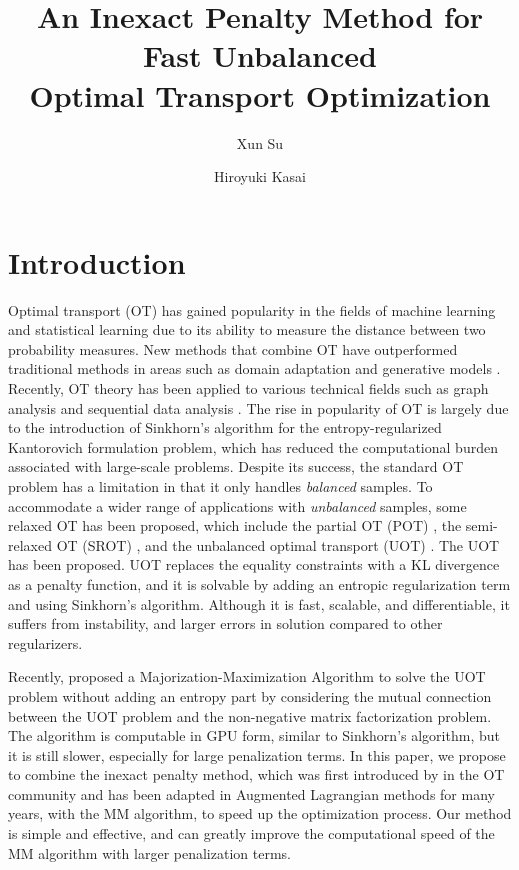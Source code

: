 \documentclass[a4paper,twocolumn]{article}
\title{An Inexact Penalty Method for Fast Unbalanced \protect\\ Optimal Transport Optimization}
\author{%
Xun Su\first
\and
Hiroyuki Kasai\second
}
\begin{document}
\maketitle

\section{Introduction}
\label{sec:int}

Optimal transport (OT) has gained popularity in the fields of machine learning and statistical learning due to its ability to measure the distance between two probability measures. New methods that combine OT have outperformed traditional methods in areas such as domain adaptation \cite{Courty_PAMI_2017} and generative models \cite{arjovsky2017wasserstein}. Recently, OT theory has been applied to various technical fields such as graph analysis \cite{Huang_SigPro_2020,Huang_ICASSP_2021,Fang_AAAI_2023} and sequential data analysis \cite{Horie_EUSIPCO_2022}. The rise in popularity of OT is largely due to the introduction of Sinkhorn's algorithm \cite{Cuturi_NIPS_2013} for the entropy-regularized Kantorovich formulation problem, which has reduced the computational burden associated with large-scale problems. Despite its success, the standard OT problem has a limitation in that it only handles {\it balanced} samples. To accommodate a wider range of applications with {\it unbalanced} samples, some relaxed OT has been proposed, which include the partial OT (POT) \cite{ferradans2013regularized}, the semi-relaxed OT (SROT) \cite{fukunaga_icassp2022,fukunaga_srsinkhorn}, and the unbalanced optimal transport (UOT) \cite{Caffarelli_AM_2010,chizat2017scaling}. The UOT has been proposed. UOT replaces the equality constraints with a KL divergence as a penalty function, and it is solvable by adding an entropic regularization term and using Sinkhorn's algorithm. Although it is fast, scalable, and differentiable, it suffers from instability, and larger errors in solution compared to other regularizers.

Recently, \cite{Chapel_NeurIPS_2021} proposed a Majorization-Maximization Algorithm to solve the UOT problem without adding an entropy part by considering the mutual connection between the UOT problem and the non-negative matrix factorization problem. The algorithm is computable in GPU form, similar to Sinkhorn's algorithm, but it is still slower, especially for large penalization terms. In this paper, we propose to combine the inexact penalty method, which was first introduced by \cite{pmlr-v115-xie20b} in the OT community and has been adapted in Augmented Lagrangian methods for many years, with the MM algorithm, to speed up the optimization process. Our method is simple and effective, and can greatly improve the computational speed of the MM algorithm with larger penalization terms.
\end{document}
